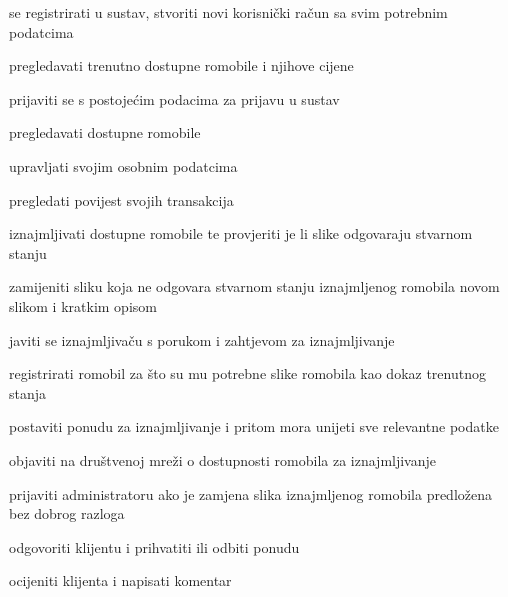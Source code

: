 			\begin{packed_enum}

				\item  {}
				
				\begin{packed_enum}
					
					\item se registrirati u sustav, stvoriti novi korisnički račun sa svim potrebnim podatcima
					\item pregledavati trenutno dostupne romobile i njihove cijene

				\end{packed_enum}

				\item  {}
				
				\begin{packed_enum}
					
					\item prijaviti se s postojećim podacima za prijavu u sustav
					\item pregledavati dostupne romobile
					\item upravljati svojim osobnim podatcima
					\item pregledati povijest svojih transakcija


				\end{packed_enum}
			
				\item  {}
				
				\begin{packed_enum}
					
					\item iznajmljivati dostupne romobile te provjeriti je li slike odgovaraju stvarnom stanju
					\item zamijeniti sliku koja ne odgovara stvarnom stanju iznajmljenog romobila novom slikom i kratkim opisom
					\item javiti se iznajmljivaču s porukom i zahtjevom za iznajmljivanje
					
				\end{packed_enum}

				\item  {}
				
				\begin{packed_enum}
					
					\item registrirati romobil za što su mu potrebne slike romobila kao dokaz trenutnog stanja
					\item postaviti ponudu za iznajmljivanje i pritom mora unijeti sve relevantne podatke
					\item objaviti na društvenoj mreži o dostupnosti romobila za iznajmljivanje
					\item prijaviti administratoru ako je zamjena slika iznajmljenog romobila predložena bez dobrog razloga
					\item odgovoriti klijentu i prihvatiti ili odbiti ponudu
					\item ocijeniti klijenta i napisati komentar


\end{packed_enum}
\end{packed_enum}
